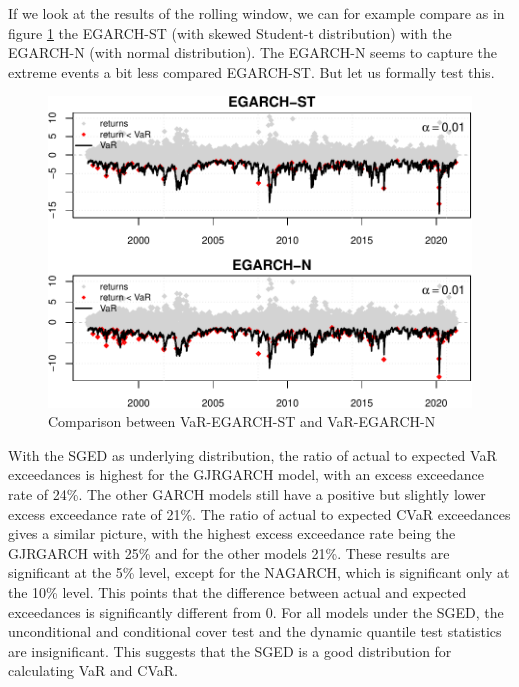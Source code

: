 \documentclass[a4paper, nobind]{templates/ociamthesis}
\begin{document}
\noindent If we look at the results of the rolling window, we can for example compare as in figure \ref{fig:figurebacktests2} the EGARCH-ST (with skewed Student-t distribution) with the EGARCH-N (with normal distribution). The EGARCH-N seems to capture the extreme events a bit less compared EGARCH-ST. But let us formally test this.~\\

\newpage

\begin{figure}[h]

{\centering \includegraphics[width=0.9\linewidth]{_main_files/figure-latex/figurebacktests2-1} 

}

\caption{Comparison between VaR-EGARCH-ST and VaR-EGARCH-N}\label{fig:figurebacktests2}
\end{figure}

With the SGED as underlying distribution, the ratio of actual to expected VaR exceedances is highest for the GJRGARCH model, with an excess exceedance rate of 24\%. The other GARCH models still have a positive but slightly lower excess exceedance rate of 21\%. The ratio of actual to expected CVaR exceedances gives a similar picture, with the highest excess exceedance rate being the GJRGARCH with 25\% and for the other models 21\%. These results are significant at the 5\% level, except for the NAGARCH, which is significant only at the 10\% level. This points that the difference between actual and expected exceedances is significantly different from 0. For all models under the SGED, the unconditional and conditional cover test and the dynamic quantile test statistics are insignificant. This suggests that the SGED is a good distribution for calculating VaR and CVaR.
\end{document}
